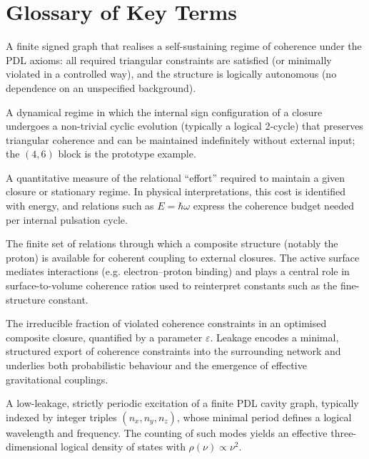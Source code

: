 \documentclass[11pt,a4paper]{article}
\begin{document}
\section{Glossary of Key Terms}
\label{app:key_glossary}

\begin{description}[style=nextline,leftmargin=1.5cm]

\item[Closure]
A finite signed graph that realises a self-sustaining regime of coherence under the PDL axioms: all required triangular constraints are satisfied (or minimally violated in a controlled way), and the structure is logically autonomous (no dependence on an unspecified background). 

\item[Logical stationary regime]
A dynamical regime in which the internal sign configuration of a closure undergoes a non-trivial cyclic evolution (typically a logical 2-cycle) that preserves triangular coherence and can be maintained indefinitely without external input; the $(4,6)$ block is the prototype example.

\item[Coherence cost]
A quantitative measure of the relational “effort” required to maintain a given closure or stationary regime. In physical interpretations, this cost is identified with energy, and relations such as \(E = \hbar \omega\) express the coherence budget needed per internal pulsation cycle.

\item[Active surface]
The finite set of relations through which a composite structure (notably the proton) is available for coherent coupling to external closures. The active surface mediates interactions (e.g. electron–proton binding) and plays a central role in surface-to-volume coherence ratios used to reinterpret constants such as the fine-structure constant.

\item[Leakage]
The irreducible fraction of violated coherence constraints in an optimised composite closure, quantified by a parameter \(\varepsilon\). Leakage encodes a minimal, structured export of coherence constraints into the surrounding network and underlies both probabilistic behaviour and the emergence of effective gravitational couplings.

\item[Cavity mode]
A low-leakage, strictly periodic excitation of a finite PDL cavity graph, typically indexed by integer triples \((n_x,n_y,n_z)\), whose minimal period defines a logical wavelength and frequency. The counting of such modes yields an effective three-dimensional logical density of states with \(\rho(\nu)\propto \nu^2\).

\end{description}




\end{document}
